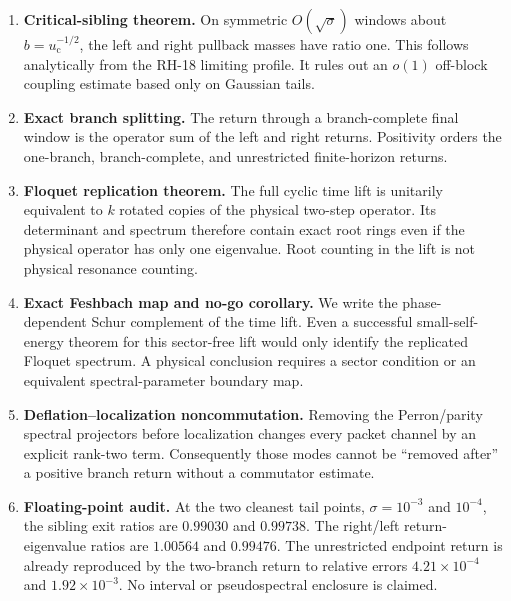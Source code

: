 \documentclass[11pt]{article}
\theoremstyle{definition}
\theoremstyle{remark}
\begin{document}
\begin{enumerate}[label=\textbf{C\arabic*.},leftmargin=3.2em]
 \item \textbf{Critical-sibling theorem.}
 On symmetric $O(\sqrt\sigma)$ windows about
 $b=u_{\mathrm c}^{-1/2}$, the left and right pullback masses have ratio one.
 This follows analytically from the RH-18 limiting profile.  It rules out an
 $o(1)$ off-block coupling estimate based only on Gaussian tails.

 \item \textbf{Exact branch splitting.}
 The return through a branch-complete final window is the operator sum of
 the left and right returns.  Positivity orders the one-branch,
 branch-complete, and unrestricted finite-horizon returns.

 \item \textbf{Floquet replication theorem.}
 The full cyclic time lift is unitarily equivalent to $k$ rotated copies of
 the physical two-step operator.  Its determinant and spectrum therefore
 contain exact root rings even if the physical operator has only one
 eigenvalue.  Root counting in the lift is not physical resonance counting.

 \item \textbf{Exact Feshbach map and no-go corollary.}
 We write the phase-dependent Schur complement of the time lift.  Even a
 successful small-self-energy theorem for this sector-free lift would only
 identify the replicated Floquet spectrum.  A physical conclusion requires
 a sector condition or an equivalent spectral-parameter boundary map.

 \item \textbf{Deflation--localization noncommutation.}
 Removing the Perron/parity spectral projectors before localization changes
 every packet channel by an explicit rank-two term.  Consequently those
 modes cannot be ``removed after'' a positive branch return without a
 commutator estimate.

 \item \textbf{Floating-point audit.}
 At the two cleanest tail points, $\sigma=10^{-3}$ and $10^{-4}$, the sibling
 exit ratios are $0.99030$ and $0.99738$.  The right/left return-eigenvalue
 ratios are $1.00564$ and $0.99476$.  The unrestricted endpoint return is
 already reproduced by the two-branch return to relative errors
 $4.21\times10^{-4}$ and $1.92\times10^{-3}$.  No interval or pseudospectral
 enclosure is claimed.
\end{enumerate}
\end{document}
